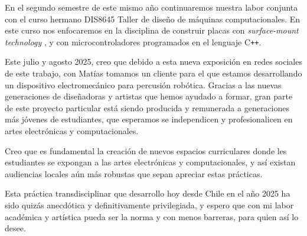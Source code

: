 \documentclass{article}
\begin{document}
En el segundo semestre de este mismo año continuaremos nuestra labor conjunta con el curso hermano DIS8645 Taller de diseño de máquinas computacionales. En este curso nos enfocaremos en la disciplina de construir placas con \textit{surface-mount technology} \cite{smt}, y con microcontroladores programados en el lenguaje C\texttt{++}.

Este julio y agosto 2025, creo que debido a esta nueva exposición en redes sociales de este trabajo, con Matías tomamos un cliente para el que estamos desarrollando un dispositivo electromecánico para percusión robótica. Gracias a las nuevas generaciones de diseñadoras y artistas que hemos ayudado a formar, gran parte de este proyecto particular está siendo producida y remunerada a generaciones más jóvenes de estudiantes, que esperamos se independicen y profesionalicen en artes electrónicas y computacionales.

Creo que es fundamental la creación de nuevos espacios curriculares donde les estudiantes se expongan a las artes electrónicas y computacionales, y así existan audiencias locales aún más robustas que sepan apreciar estas prácticas.

Esta práctica transdisciplinar que desarrollo hoy desde Chile en el año 2025 ha sido quizás anecdótica y definitivamente privilegiada, y espero que con mi labor académica y artística pueda ser la norma y con menos barreras, para quien así lo desee.

\clearpage

\printbibliography[title={Bibliografía}, heading=bibintoc]
\end{document}
